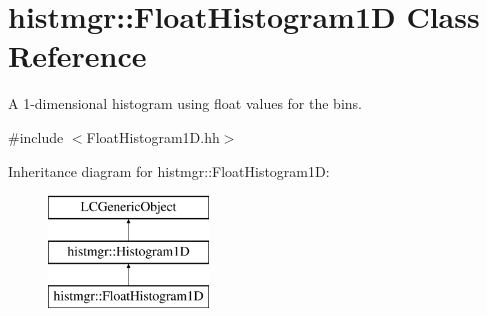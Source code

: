 \section{histmgr\-:\-:Float\-Histogram1\-D Class Reference}
\label{classhistmgr_1_1FloatHistogram1D}


A 1-\/dimensional histogram using float values for the bins.  




{\ttfamily \#include $<$Float\-Histogram1\-D.\-hh$>$}

Inheritance diagram for histmgr\-:\-:Float\-Histogram1\-D\-:\begin{figure}[H]
\begin{center}
\leavevmode
\includegraphics[height=3.000000cm]{classhistmgr_1_1FloatHistogram1D}
\end{center}
\end{figure}
